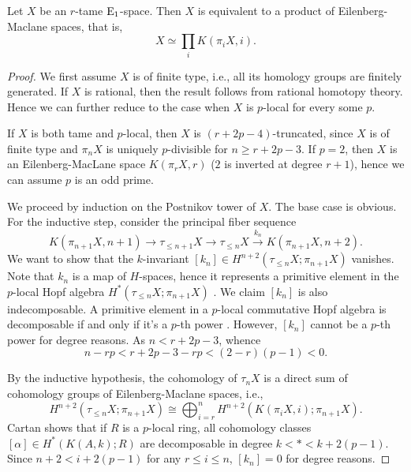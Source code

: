 \begin{proposition}
\label{Decomp of tame H-spaces}
	Let $X$ be an $r$-tame $\operatorname{E}_1$-space. Then $X$ is equivalent to a product of Eilenberg-Maclane spaces, that is, 
	\[
	X \simeq \prod_i K(\pi_i X, i).
	\]
\end{proposition}
\pagebreak
\begin{proof}
We first assume $X$ is of finite type, i.e., all its homology groups are finitely generated. If $X$ is rational, then the result follows from rational homotopy theory. Hence we can further reduce to the case when $X$ is $p$-local for every some $p$.

If $X$ is both tame and $p$-local, then $X$ is $(r+2p-4)$-truncated, since $X$ is of finite type and  $\pi_{n}X$ is uniquely $p$-divisible for $n \geq r+2p-3$. If $p=2$, then $X$ is an Eilenberg-MacLane space $K(\pi_r X, r)$ ($2$ is inverted at degree $r+1$), hence we can assume $p$ is an odd prime. 

We proceed by induction on the Postnikov tower of $X$.
The base case is obvious. 	
For the inductive step, consider the principal fiber sequence
$$
K(\pi_{n+1}X,n+1)\to 
\tau_{\leq n+1}X
\to
\tau_{\leq n}X
\xrightarrow{k_n}
K(\pi_{n+1}X,n+2).
$$
We want to show that the $k$-invariant $[k_n]\in H^{n+2}(\tau_{\leq n}X; \pi_{n+1}X)$ vanishes. 
Note that $k_n$ is a map of $H$-spaces, hence it represents a primitive element in the $p$-local Hopf algebra $H^*(\tau_{\leq n}X; \pi_{n+1}X)$ \cite[Theorem 3.2]{D.Kahn}. 
We claim $[k_n]$ is also indecomposable.
A primitive element in a $p$-local commutative Hopf algebra is decomposable if and only if it's a $p$-th power \cite[Proposition 4.21]{Milnor-Moore}.
However, $[k_n]$ cannot be a $p$-th power for degree reasons. As
$n<r+2p-3$, whence
\[
n-rp<r+2p-3-rp< (2-r)(p-1)<0.
\]
	
By the inductive hypothesis, the cohomology of $\tau_n X$ is a direct sum of cohomology groups of Eilenberg-Maclane spaces, i.e., 
$$
H^{n+2}(\tau_{\leq n} X; \pi_{n+1}X)\cong
\bigoplus_{i = r}^{n} H^{n+2}(K(\pi_i X, i); \pi_{n+1}X).
$$
Cartan \cite{Cartan_I} shows that if $R$ is a $p$-local ring, all cohomology classes  $[\alpha]\in H^{*}(K(A,k);R)$ are decomposable in degree $k<*<k+2(p-1)$. 
Since $n+2 < i + 2(p-1)$ for any $r\leq i \leq n$,
$[k_n]=0$ for degree reasons.


\end{proof}
